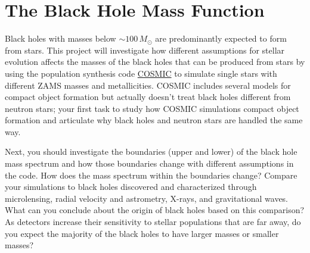 \documentclass[10pt]{extarticle}
\begin{document}
\section{The Black Hole Mass Function}
Black holes with masses below $\sim100\,M_{\odot}$ are predominantly expected to
form from stars. This project will investigate how different assumptions for
stellar evolution affects the masses of the black holes that can be produced
from stars by using the population synthesis code
\href{https://cosmic-popsynth.github.io/}{COSMIC} to simulate single stars with
different ZAMS masses and metallicities. COSMIC includes several models for
compact object formation but actually doesn't treat black holes different from
neutron stars; your first task to study how COSMIC simulations compact object
formation and articulate why black holes and neutron stars are handled the same
way. 

Next, you should investigate the boundaries (upper and lower) of the black hole
mass spectrum and how those boundaries change with different assumptions in the
code. How does the mass spectrum within the boundaries change? Compare your
simulations to black holes discovered and characterized through microlensing,
radial velocity and astrometry, X-rays, and gravitational waves. What can you
conclude about the origin of black holes based on this comparison? As detectors
increase their sensitivity to stellar populations that are far away, do you
expect the majority of the black holes to have larger masses or smaller masses?
\end{document}
